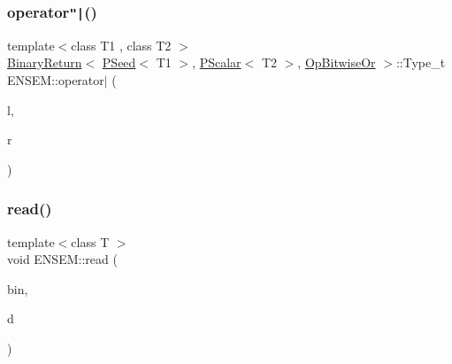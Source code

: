 \mbox{\label{group__primseed_ga65b26c68c77d19a64ae5896efce8b37c}} 
\subsubsection{\texorpdfstring{operator\texttt{"|}()}{operator|()}\hspace{0.1cm}{\footnotesize\ttfamily [2/2]}}
{\footnotesize\ttfamily template$<$class T1 , class T2 $>$ \\
\mbox{\hyperlink{structENSEM_1_1BinaryReturn}{Binary\+Return}}$<$ \mbox{\hyperlink{classENSEM_1_1PSeed}{P\+Seed}}$<$ T1 $>$, \mbox{\hyperlink{classENSEM_1_1PScalar}{P\+Scalar}}$<$ T2 $>$, \mbox{\hyperlink{structENSEM_1_1OpBitwiseOr}{Op\+Bitwise\+Or}} $>$\+::Type\+\_\+t E\+N\+S\+E\+M\+::operator$\vert$ (\begin{DoxyParamCaption}\item[{const \mbox{\hyperlink{classENSEM_1_1PSeed}{P\+Seed}}$<$ T1 $>$ \&}]{l,  }\item[{const \mbox{\hyperlink{classENSEM_1_1PScalar}{P\+Scalar}}$<$ T2 $>$ \&}]{r }\end{DoxyParamCaption})\hspace{0.3cm}{\ttfamily [inline]}}

\mbox{\label{group__primseed_ga89a527bfdc043ff49f07e44a2fbb7a90}} 
\subsubsection{\texorpdfstring{read()}{read()}\hspace{0.1cm}{\footnotesize\ttfamily [1/2]}}
{\footnotesize\ttfamily template$<$class T $>$ \\
void E\+N\+S\+E\+M\+::read (\begin{DoxyParamCaption}\item[{\mbox{\hyperlink{classADATIO_1_1BinaryReader}{A\+D\+A\+T\+I\+O\+::\+Binary\+Reader}} \&}]{bin,  }\item[{\mbox{\hyperlink{classENSEM_1_1PSeed}{P\+Seed}}$<$ T $>$ \&}]{d }\end{DoxyParamCaption})}



